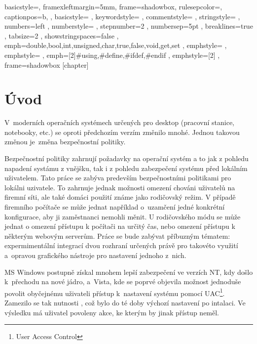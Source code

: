 \renewcommand*\lstlistingname{Výpis}
\setlength{\parskip}{3pt plus 1pt minus 1pt}
\lstset
{
    basicstyle=\footnotesize,
    framexleftmargin=5mm,
    frame=shadowbox,
    rulesepcolor=\color{blue},
    captionpos=b,
, basicstyle=\footnotesize\ttfamily
, keywordstyle=\color{blue}
, commentstyle=\color{OliveGreen}
, stringstyle=\color{Maroon}
, numbers=left
, numberstyle=\scriptsize
, stepnumber=2
, numbersep=5pt
, breaklines=true
, tabsize=2
, showstringspaces=false
, emph={double,bool,int,unsigned,char,true,false,void,get,set}
, emphstyle=\color{blue}
, emphstyle=\color{red}
, emph={[2]\#using,\#define,\#ifdef,\#endif}
, emphstyle={[2]\color{blue}}
, frame=shadowbox
}
[chapter]
\newcommand{\cppc}[1]{\lstinline[language=C++]$#1$}

\chapter{Úvod}
V~moderních operačních systémech určených pro desktop (pracovní stanice, notebooky, etc.) se oproti předchozím verzím změnilo mnohé. Jednou takovou změnou je~změna bezpečnostní politiky.

Bezpečnostní politiky zahrnují požadavky na operační systém a to jak z pohledu napadení systámu z vnějšku, tak i z pohledu zabezpečení systému před lokálním uživatelem. Tato práce se zabýva predevším bezpečnostními politikami pro lokálni uzivatele. To zahrnuje jednak možnosti omezení chováni uživatelů na firemní síti, ale také domáci použití známe jako rodičovský režim.
V případě firemního počítače se může jednat například o~uzamčení jedné konkrétní konfigurace, aby ji zaměstnanci nemohli měnit. U rodičovského módu se může jednat o omezení přístupu k počítači na určitý čas, nebo omezení přístupu k některým webovým serverům. Práce se bude zabývat příbuzným tématem: expermimentální integrací dvou rozhraní určených právě pro takovéto využití a~opravou grafického nástroje pro nastavení jednoho z~nich.


MS Windows postupně získal mnohem lepší zabezpečení ve verzích NT, kdy došlo k~přechodu na nové jádro, a~Vista, kde se poprvé objevila možnost jednoduše povolit obyčejnému uživateli přístup k~nastavení systému pomocí UAC\footnote{User Access Control}. Zamezilo se tak nutnosti , což bylo do té doby výchozí nastavení po intalaci. Ve výsledku má uživatel povoleny akce, ke kterým by jinak přístup neměl.

